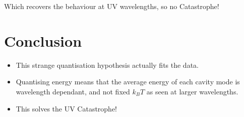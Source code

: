 Which recovers the behaviour at UV wavelengths, so no Catastrophe!

\section*{Conclusion}
\begin{itemize}
    \item This strange quantisation hypothesis actually fits the data.
    \item Quantising energy means that the average energy of each cavity mode is wavelength dependant, and not fixed $k_B T$ as seen at larger wavelengths.
    \item This solves the UV Catastrophe! 
\end{itemize}
